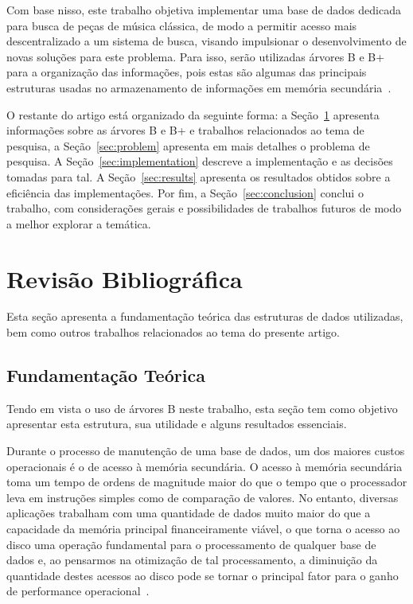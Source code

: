 \documentclass[12pt]{article}
\begin{document}
Com base nisso, este trabalho objetiva implementar uma base de dados dedicada
para busca de peças de música clássica, de modo a permitir acesso mais
descentralizado a um sistema de busca, visando impulsionar o desenvolvimento de
novas soluções para este problema. Para isso, serão utilizadas árvores B e B+
para a organização das informações, pois estas são algumas das principais
estruturas usadas no armazenamento de informações em memória
secundária~\cite{Co:79}.

O restante do artigo está organizado da seguinte forma: a
Seção~\ref{sec:revisao} apresenta informações sobre as árvores B e B+ e
trabalhos relacionados ao tema de pesquisa, a Seção~\ref{sec:problem} apresenta
em mais detalhes o problema de pesquisa. A Seção~\ref{sec:implementation}
descreve a implementação e as decisões tomadas para tal. A
Seção~\ref{sec:results} apresenta os resultados obtidos sobre a eficiência das
implementações. Por fim, a Seção~\ref{sec:conclusion} conclui o trabalho, com
considerações gerais e possibilidades de trabalhos futuros de modo a melhor
explorar a temática.



\section{Revisão Bibliográfica} \label{sec:revisao} Esta seção apresenta a
fundamentação teórica das estruturas de dados utilizadas, bem como outros
trabalhos relacionados ao tema do presente artigo.

\subsection{Fundamentação Teórica}
Tendo em vista o uso de árvores B neste trabalho, esta seção tem como objetivo
apresentar esta estrutura, sua utilidade e alguns resultados essenciais.

Durante o processo de manutenção de uma base de dados, um dos maiores custos
operacionais é o de acesso à memória secundária. O acesso à memória secundária
toma um tempo de ordens de magnitude maior do que o tempo que o processador leva
em instruções simples como de comparação de valores. No entanto, diversas
aplicações trabalham com uma quantidade de dados muito maior do que a capacidade
da memória principal financeiramente viável, o que torna o acesso ao disco uma
operação fundamental para o processamento de qualquer base de dados e, ao
pensarmos na otimização de tal processamento, a diminuição da quantidade destes
acessos ao disco pode se tornar o principal fator para o ganho de performance
operacional~\cite{clrs:22}.
\end{document}
